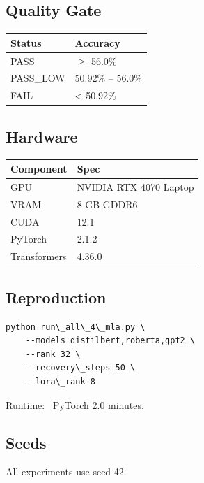 \subsection{Quality Gate}

\begin{table}[H]
\centering
\small
\begin{tabular}{ll}
\toprule
\textbf{Status} & \textbf{Accuracy} \\
\midrule
PASS & $\ge$ 56.0\% \\
PASS\_LOW & 50.92\% -- 56.0\% \\
FAIL & \textless{} 50.92\% \\
\bottomrule
\end{tabular}
\end{table}

\subsection{Hardware}

\begin{table}[H]
\centering
\small
\begin{tabular}{ll}
\toprule
\textbf{Component} & \textbf{Spec} \\
\midrule
GPU & NVIDIA RTX 4070 Laptop \\
VRAM & 8 GB GDDR6 \\
CUDA & 12.1 \\
PyTorch & 2.1.2 \\
Transformers & 4.36.0 \\
\bottomrule
\end{tabular}
\end{table}

\subsection{Reproduction}

\begin{lstlisting}
python run\_all\_4\_mla.py \
    --models distilbert,roberta,gpt2 \
    --rank 32 \
    --recovery\_steps 50 \
    --lora\_rank 8
\end{lstlisting}

Runtime: ~PyTorch 2.0 minutes.

\subsection{Seeds}

All experiments use seed 42.

